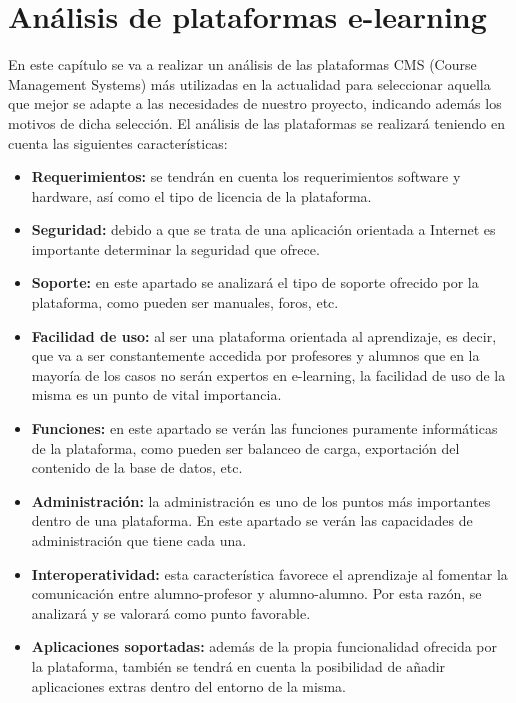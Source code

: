 \chapter[Análisis de plataformas e-learning]{\label{}
Análisis de plataformas e-learning}

En este capítulo se va a realizar un análisis de las plataformas CMS (Course Management Systems) más utilizadas en la actualidad para seleccionar aquella que mejor se adapte a las necesidades de nuestro proyecto, indicando además los motivos de dicha selección. El análisis de las plataformas se realizará teniendo en cuenta las siguientes características:

\begin{itemize}
	\item \textbf{Requerimientos:} se tendrán en cuenta los requerimientos software y hardware, así como el tipo de licencia de la plataforma.
	\item \textbf{Seguridad:} debido a que se trata de una aplicación orientada a Internet es importante determinar la seguridad que ofrece.
	\item \textbf{Soporte:} en este apartado se analizará el tipo de soporte ofrecido por la plataforma, como pueden ser manuales, foros, etc.
	\item \textbf{Facilidad de uso:} al ser una plataforma orientada al aprendizaje, es decir, que va a ser constantemente accedida por profesores y alumnos que en la mayoría de los casos no serán expertos en e-learning, la facilidad de uso de la misma es un punto de vital importancia.
	\item \textbf{Funciones:} en este apartado se verán las funciones puramente informáticas de la plataforma, como pueden ser balanceo de carga, exportación del contenido de la base de datos, etc.
	\item \textbf{Administración:} la administración es uno de los puntos más importantes dentro de una plataforma. En este apartado se verán las capacidades de administración que tiene cada una.
	\item \textbf{Interoperatividad:} esta característica favorece el aprendizaje al fomentar la comunicación entre alumno-profesor y alumno-alumno. Por esta razón, se analizará y se valorará como punto favorable.
	\item \textbf{Aplicaciones soportadas:} además de la propia funcionalidad ofrecida por la plataforma, también se tendrá en cuenta la posibilidad de añadir aplicaciones extras dentro del entorno de la misma.
\end{itemize}

